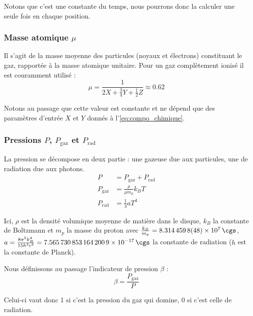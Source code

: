 Notons que c’est une constante du temps, nous pourrons donc la calculer une
seule fois en chaque position.

\subsubsection{\texorpdfstring{Masse atomique $\mu$}{Masse atomique μ}}

Il s’agit de la masse moyenne des particules (noyaux et électrons) constituant
le gaz, rapportée à la masse atomique unitaire. Pour un gaz complètement ionisé
il est couramment utilisé :
\begin{equation}
    \label{eq:masse_atomique}
    \mu = \frac{1}{2 X + \frac{3}{4} Y + \frac{1}{2} Z} \approx 0.62
\end{equation}

Notons au passage que cette valeur est constante et ne dépend que des
paramètres d’entrée $X$ et $Y$ donnés à l’\cref{eq:compo_chimique}.

\subsubsection{\texorpdfstring{Pressions $P$, $P_\mathrm{gaz}$ et $P_\mathrm{rad}$}{Pressions P, Pgaz et Prad}}

La pression se décompose en deux partie : une gazeuse due aux particules, une
de radiation due aux photons.
\begin{align}
    \label{eq:pression}
    P &= P_{\mathrm{gaz}} + P_{\mathrm{rad}} \\
    \label{eq:pression_gaz}
    P_{\mathrm{gaz}} &= \frac{\rho}{\mu m_p} k_B T \\
    \label{eq:pression_radiation}
    P_{\mathrm{rad}} &= \frac{1}{3} a T^4
\end{align}

Ici, $\rho$ est la densité volumique moyenne de matière dans le disque, $k_B$
la constante de Boltzmann et $m_p$ la masse du proton avec $\frac{k_B}{m_p} =
\SI{8.3144598(48)d7}{\cgs}$, $a = \frac{8 \pi^5 k_B^4}{15 h^3 c^3} =
\SI{7.5657308531642009e-17}{\cgs}$ la constante de radiation ($h$ est la
constante de Planck).

Nous définissons au passage l’indicateur de pression $\beta$ :
\begin{equation}
    \label{eq:indicateur_beta}
    \beta = \frac{P_{\mathrm{gaz}}}{P}
\end{equation}

Celui-ci vaut donc 1 si c’est la pression du gaz qui domine, 0 si c’est celle
de radiation.

